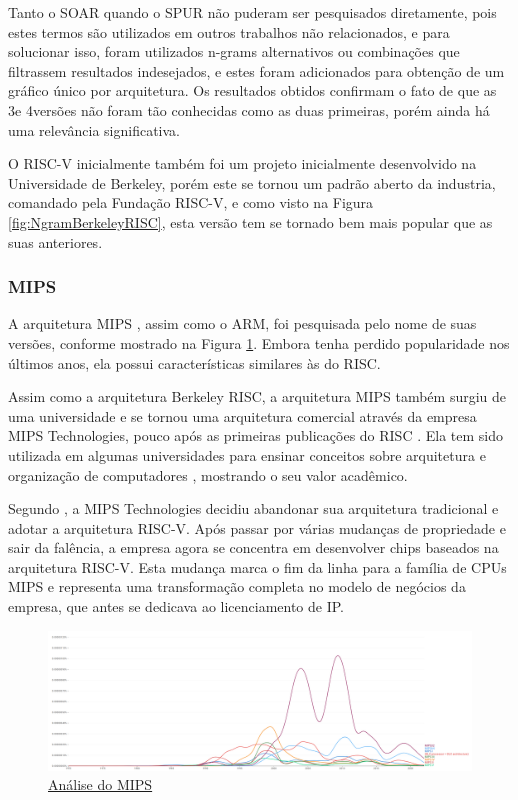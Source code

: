 \documentclass[
	article,			%
	11pt,				%
	oneside,			%
	a4paper,			%
	english,			%
	brazil,				%
	sumario=tradicional
	]{abntex2}
\begin{document}
Tanto o SOAR quando o SPUR não puderam ser pesquisados diretamente, pois estes termos são utilizados em outros trabalhos não relacionados, e para solucionar isso, foram utilizados n-grams alternativos ou combinações que filtrassem resultados indesejados, e estes foram adicionados para obtenção de um gráfico único por arquitetura. Os resultados obtidos confirmam o fato de que as 3\degree e 4\degree versões não foram tão conhecidas como as duas primeiras, porém ainda há uma relevância significativa.

O RISC-V inicialmente também foi um projeto inicialmente desenvolvido na Universidade de Berkeley, porém este se tornou um padrão aberto da industria, comandado pela Fundação RISC-V\cite{patterson_risc-v_2016}, e como visto na Figura \ref{fig:NgramBerkeleyRISC}, esta versão tem se tornado bem mais popular que as suas anteriores.

\subsubsection{MIPS}

A arquitetura MIPS \cite{mips_tech_llc_mips32_2016}, assim como o ARM, foi pesquisada pelo nome de suas versões, conforme mostrado na Figura \ref{fig:NgramMIPS}. Embora tenha perdido popularidade nos últimos anos, ela possui características similares às do RISC.

Assim como a arquitetura Berkeley RISC, a arquitetura MIPS também surgiu de uma universidade e se tornou uma arquitetura comercial através da empresa MIPS Technologies, pouco após as primeiras publicações do RISC \cite{patterson_computer_1996}. Ela tem sido utilizada em algumas universidades para ensinar conceitos sobre arquitetura e organização de computadores \cite{vollmar_mips_2005}, mostrando o seu valor acadêmico.

Segundo , a MIPS Technologies decidiu abandonar sua arquitetura tradicional e adotar a arquitetura RISC-V. Após passar por várias mudanças de propriedade e sair da falência, a empresa agora se concentra em desenvolver chips baseados na arquitetura RISC-V. Esta mudança marca o fim da linha para a família de CPUs MIPS e representa uma transformação completa no modelo de negócios da empresa, que antes se dedicava ao licenciamento de IP.

\begin{figure}[H]
    \centering
    \includegraphics[width=1\linewidth]{Ngrams/MIPS_comparison.png}
    \caption{\href{https://books.google.com/ngrams/graph?content=MIPS\%20I\%2CMIPS\%20II\%2CMIPS\%20III\%2CMIPS\%20IV\%2CMIPS\%20V\%2CMIPS32\%2CMIPS64&year_start=1970&year_end=2022&corpus=en&smoothing=1&case_insensitive=false}{Análise do MIPS}}
    \label{fig:NgramMIPS}
\end{figure}
\end{document}
